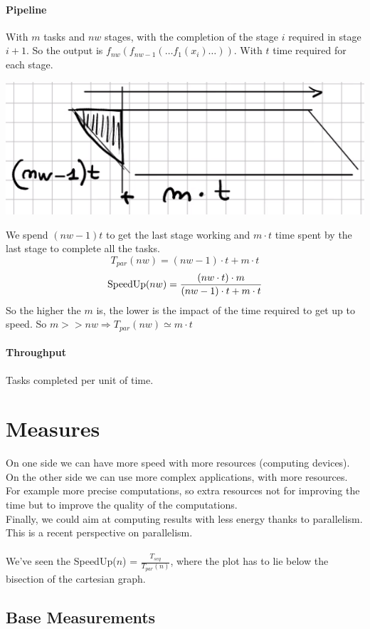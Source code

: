 \documentclass[10pt]{report}
\begin{document}
\paragraph{Pipeline} With $m$ tasks and $nw$ stages, with the completion of the stage $i$ required in stage $i+1$. So the output is $f_{nw}(f_{nw-1}(\ldots f_1(x_i)\ldots))$. With $t$ time required for each stage.
\begin{center}
	\includegraphics[scale=0.5]{2.png}
\end{center}
We spend $(nw-1)t$ to get the last stage working and $m\cdot t$ time spent by the last stage to complete all the tasks.
$$T_{par}(nw) = (nw-1)\cdot t + m\cdot t$$
$$\hbox{SpeedUp}(nw)=\frac{(nw\cdot t)\cdot m}{(nw-1)\cdot t + m\cdot t}$$
So the higher the $m$ is, the lower is the impact of the time required to get up to speed. So $m >> nw \Rightarrow T_{par}(nw) \simeq m\cdot t$
\paragraph{Throughput} Tasks completed per unit of time.
\section{Measures}
On one side we can have more speed with more resources (computing devices). On the other side we can use more complex applications, with more resources. For example more precise computations, so extra resources not for improving the time but to improve the quality of the computations.\\
Finally, we could aim at computing results with less energy thanks to parallelism. This is a recent perspective on parallelism.\\\\
We've seen the SpeedUp($n$) = $\frac{T_{seq}}{T_{par}(n)}$, where the plot has to lie below the bisection of the cartesian graph.
\subsection{Base Measurements}
\end{document}
